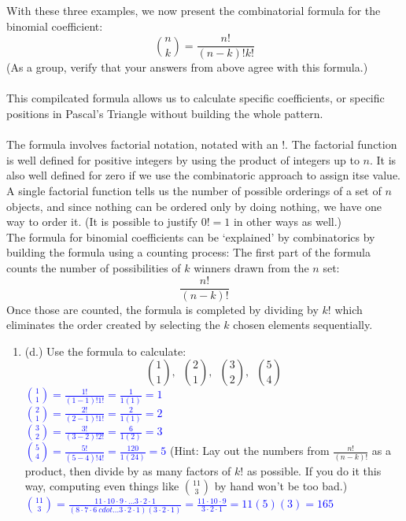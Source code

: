 \documentclass{ximera}
\begin{document}
\begin{exercise}
    With these three examples, we now present the combinatorial formula for the binomial coefficient:
    \[{n\choose k}=\frac{n!}{(n-k)!k!}\]
    (As a group, verify that your answers from above agree with this formula.)\\
    \\
    This compilcated formula allows us to calculate specific coefficients, or specific positions in Pascal's Triangle without building the whole pattern.\\
    \\
    The formula involves factorial notation, notated with an $!$.  The factorial function is well defined for positive integers by using the product of integers up to $n$.  It is also well defined for zero if we use the combinatoric approach to assign itse value.  A single factorial function tells us the number of possible orderings of a set of $n$ objects, and since nothing can be ordered only by doing nothing, we have one way to order it.  (It is possible to justify $0!=1$ in other ways as well.)\\
    The formula for binomial coefficients can be `explained' by combinatorics by building the formula using a counting process: The first part of the formula counts the number of possibilities of $k$ winners drawn from the $n$ set: 
    \[\frac{n!}{(n-k)!}\]
    Once those are counted, the formula is completed by dividing by $k!$ which eliminates the order created by selecting the $k$ chosen elements sequentially.\\
    \begin{enumerate}
        \item (d.) Use the formula to calculate: 
        \[{1\choose 1}, \,\,\, {2\choose 1}, \,\,\, {3\choose 2}, \,\,\, {5 \choose 4}\]
        \textcolor{blue}{ ${1\choose 1}=\frac{1!}{(1-1)!1!}=\frac{1}{1(1)}=1$\\
        ${2 \choose 1}=\frac{2!}{(2-1)!1!}=\frac{2}{1(1)}=2$\\
        ${3\choose 2}=\frac{3!}{(3-2)!2!}=\frac{6}{1(2)}=3$\\
        ${5\choose 4}=\frac{5!}{(5-4)!4!}=\frac{120}{1(24)}=5$}
        (Hint: Lay out the numbers from $\frac{n!}{(n-k)!}$ as a product, then divide by as many factors of $k!$ as possible.  If you do it this way, computing even things like $11\choose 3$ by hand won't be too bad.) \\
        \textcolor{blue}{${11\choose 3}=\frac{11\cdot 10\cdot 9\cdot \dots 3 \cdot 2 \cdot 1}{(8\cdot 7 \cdot 6\ cdot \dots 3\cdot 2\cdot 1)(3\cdot 2 \cdot 1)}=\frac{11\cdot 10 \cdot 9}{3\cdot 2 \cdot 1}=11(5)(3)=165$}
    \end{enumerate}
\end{exercise}
\end{document}
